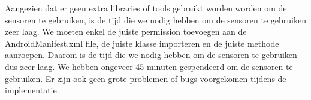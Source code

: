 Aangezien dat er geen extra libraries of tools gebruikt worden worden om de sensoren te gebruiken, 
is de tijd die we nodig hebben om de sensoren te gebruiken zeer laag. We moeten enkel de juiste 
permission toevoegen aan de AndroidManifest.xml file, de juiste klasse importeren en de juiste 
methode aanroepen. Daarom is de tijd die we nodig hebben om de sensoren te gebruiken dus zeer laag. 
We hebben ongeveer 45 minuten gespendeerd om de sensoren te gebruiken. Er zijn ook geen grote problemen of 
bugs voorgekomen tijdens de implementatie.



